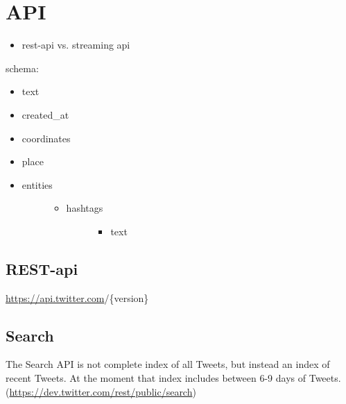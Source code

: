 \documentclass[letterpaper,10pt,english]{sphinxmanual}
\begin{document}
\section{API}
\label{twitter:api}\begin{itemize}
\item {} 
rest-api vs. streaming api

\end{itemize}

schema:
\begin{itemize}
\item {} 
text

\item {} 
created\_at

\item {} 
coordinates

\item {} 
place

\item {} \begin{description}
\item[{entities}] \leavevmode\begin{itemize}
\item {} \begin{description}
\item[{hashtags}] \leavevmode\begin{itemize}
\item {} 
text

\end{itemize}

\end{description}

\end{itemize}

\end{description}

\end{itemize}


\subsection{REST-api}
\label{twitter:rest-api}
\href{https://api.twitter.com}{https://api.twitter.com}/\{version\}


\subsection{Search}
\label{twitter:search}
The Search API is not complete index of all Tweets, but instead an index of recent Tweets.
At the moment that index includes between 6-9 days of Tweets. (\href{https://dev.twitter.com/rest/public/search}{https://dev.twitter.com/rest/public/search})
\end{document}
